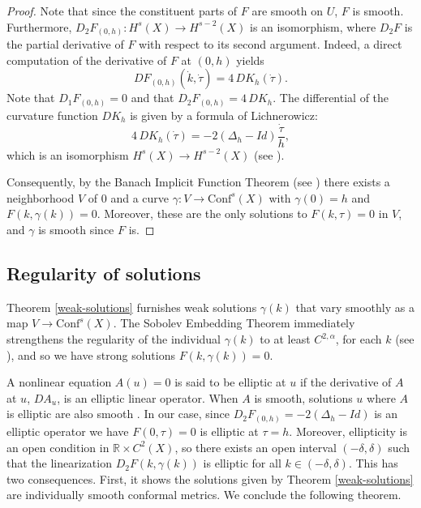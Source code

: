 \documentclass{amsart}
\newcommand{\R}{\mathbb{R}}
\begin{document}
\begin{proof} 
Note that since the constituent parts of $F$ are smooth on $U$, $F$ is smooth. 
Furthermore, $D_2F_{(0,h)} : H^s(X) \to H^{s-2}(X)$ is an isomorphism, where $D_2F$ is the partial derivative of $F$ with respect to its second argument. 
Indeed, a direct computation of the derivative of $F$ at $(0,h)$ yields 
\[
DF_{(0,h)}(\dot{k},\dot{\tau}) = 4 \, D K_h(\dot{\tau}).
\]
Note that $D_1F_{(0,h)} = 0$ and that $D_2F_{(0,h)} = 4 \, DK_h$. 
The differential of the curvature function $D K_h$ is given by a formula of Lichnerowicz: 
\[
 4\, DK_h(\dot{\tau}) = -2(\Delta_h - Id)\frac{\dot{\tau}}{h},
\]
which is an isomorphism $H^s(X) \to H^{s-2}(X)$ (see \cite[Page 33]{tromba1992}).

Consequently, by the Banach Implicit Function Theorem (see \cite[Theorem 17.6]{gilbarg-trudinger2001}) there exists a neighborhood $V$ of $0$ and a curve $\gamma : V \to \mathrm{Conf}^s(X)$ with $\gamma(0) = h$ and $F(k, \gamma(k)) = 0$. 
Moreover, these are the only solutions to $F(k,\tau) = 0$ in $V$, and $\gamma$ is smooth since $F$ is.
\end{proof}



\subsection{Regularity of solutions}\label{regularity}



Theorem \ref{weak-solutions} furnishes weak solutions $\gamma(k)$ that vary smoothly as a map $V \to \mathrm{Conf}^s(X)$. 
The Sobolev Embedding Theorem immediately strengthens the regularity of the individual $\gamma(k)$ to at least $C^{2,\alpha}$, for each $k$ (see \cite{aubin1982}), and so we have strong solutions $F(k,\gamma(k)) = 0$.

 
A nonlinear equation $A(u) = 0$ is said to be elliptic at $u$ if the derivative of $A$ at $u$, $DA_u$, is an elliptic linear operator. 
When $A$ is smooth, solutions $u$ where $A$ is elliptic are also smooth \cite[Lemma 17.16]{gilbarg-trudinger2001}. 
In our case, since $D_2F_{(0,h)} = -2(\Delta_h - Id)$ is an elliptic operator we have $F(0, \tau) = 0$ is elliptic at $\tau = h$. 
Moreover, ellipticity is an open condition in $\R \times C^2(X)$, so there exists an open interval $(-\delta,\delta)$ such that the linearization $D_2F(k,\gamma(k))$ is elliptic for all $k \in (-\delta,\delta)$.
This has two consequences.
First, it shows the solutions given by Theorem \ref{weak-solutions} are individually smooth conformal metrics.
We conclude the following theorem.
\end{document}
